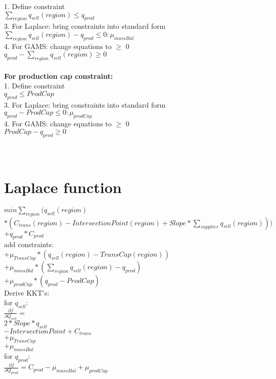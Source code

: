 \documentclass{article}
\begin{document}
1. Define constraint\\
\quad$\sum_{region} q_{sell}(region) \leq q_{prod} $\\
3. For Laplace: bring constraints into standard form\\
\quad$\sum_{region} q_{sell}(region) - q_{prod}  \leq 0 : \mu_{massBal}$\\
4. For GAMS: change equations to $\geq$ 0\\
\quad$q_{prod}  - \sum_{region} q_{sell}(region) \geq 0\: $\\


\hfill\\
\textbf{For	production cap constraint: }\\
1. Define constraint\\
\quad$q_{prod} \leq ProdCap$\\
3. For Laplace: bring constraints into standard form\\
\quad$q_{prod} - ProdCap\leq 0  : \mu_{prodCap}$\\
4. For GAMS: change equations to $\geq$ 0\\
\quad$ProdCap - q_{prod} \geq 0$\\


\hfill\\ 
\hfill\\
\section*{Laplace function}
\quad$min \sum_{region}\Big( q_{sell}(region) $\\
\quad$*(C_{trans}(region) - IntersectionPoint(region) + Slope * \sum_{supplier} q_{sell}(region))\Big) $\\
\quad$+ q_{prod}*C_{prod}$\\
add constraints:\\
\quad$+\mu_{TransCap} * (q_{sell}(region) - TransCap(region))$\\
\quad$+\mu_{massBal} * (\sum_{region} q_{sell}(region) - q_{prod})$\\
\quad$+\mu_{prodCap}* (q_{prod} - ProdCap)$\\

Derive KKT's:\\ 	
for $q_{sell}:$\\
\quad$\frac{\partial f}{\partial Q_{sell}} = $\\
\quad$2*Slope*q_{sell} $\\
\quad$- IntersectionPoint + C_{trans}$\\
\quad$+\mu_{TransCap}$\\
\quad$+\mu_{massBal}$\\

for $q_{prod}:$\\
\quad$\frac{\partial f}{\partial Q_{prod}} = C_{prod} - \mu_{massBal} + \mu_{prodCap}$\\
\end{document}
